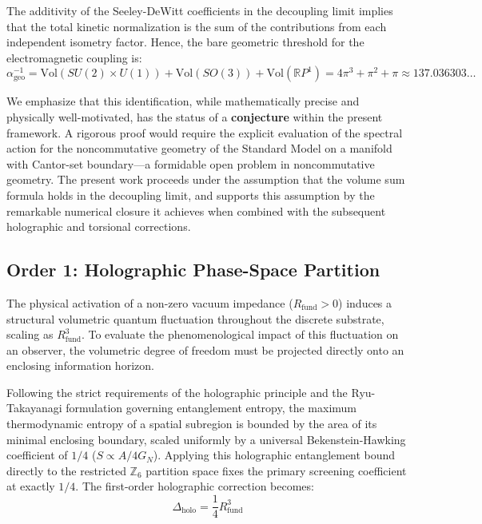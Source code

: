 \documentclass[12pt,a4paper]{article}
\begin{document}
The additivity of the Seeley-DeWitt coefficients in the decoupling limit \cite{connes1996} implies that the total kinetic normalization is the sum of the contributions from each independent isometry factor. Hence, the bare geometric threshold for the electromagnetic coupling is:
\begin{equation}
\boxed{\alpha^{-1}_{\text{geo}} = \text{Vol}(SU(2) \times U(1)) + \text{Vol}(SO(3)) + \text{Vol}(\mathbb{R}P^1) = 4\pi^3 + \pi^2 + \pi \approx 137.036303\dots}
\end{equation}

We emphasize that this identification, while mathematically precise and physically well-motivated, has the status of a \textbf{conjecture} within the present framework. A rigorous proof would require the explicit evaluation of the spectral action for the noncommutative geometry of the Standard Model on a manifold with Cantor-set boundary---a formidable open problem in noncommutative geometry. The present work proceeds under the assumption that the volume sum formula holds in the decoupling limit, and supports this assumption by the remarkable numerical closure it achieves when combined with the subsequent holographic and torsional corrections.

\subsection{Order 1: Holographic Phase-Space Partition}

The physical activation of a non-zero vacuum impedance ($R_{\text{fund}} > 0$) induces a structural volumetric quantum fluctuation throughout the discrete substrate, scaling as $R_{\text{fund}}^3$. To evaluate the phenomenological impact of this fluctuation on an observer, the volumetric degree of freedom must be projected directly onto an enclosing information horizon.

Following the strict requirements of the holographic principle and the Ryu-Takayanagi formulation governing entanglement entropy, the maximum thermodynamic entropy of a spatial subregion is bounded by the area of its minimal enclosing boundary, scaled uniformly by a universal Bekenstein-Hawking coefficient of $1/4$ ($S \propto A/4G_N$). Applying this holographic entanglement bound directly to the restricted $\mathbb{Z}_6$ partition space fixes the primary screening coefficient at exactly $1/4$. The first-order holographic correction becomes:
\begin{equation}
\Delta_{\text{holo}} = \frac{1}{4} R_{\text{fund}}^3
\end{equation}
\end{document}
